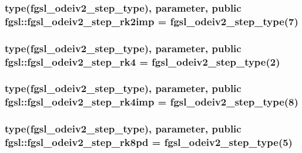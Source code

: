 \hypertarget{classfgsl_a7b4cc51dc91d507009b26f542f372bbd}{
\subsubsection[{fgsl\-\_\-odeiv2\-\_\-step\-\_\-rk2imp}]{\setlength{\rightskip}{0pt plus 5cm}type({\bf fgsl\-\_\-odeiv2\-\_\-step\-\_\-type}), parameter, public fgsl\-::fgsl\-\_\-odeiv2\-\_\-step\-\_\-rk2imp = {\bf fgsl\-\_\-odeiv2\-\_\-step\-\_\-type}(7)}}\label{classfgsl_a7b4cc51dc91d507009b26f542f372bbd}
\hypertarget{classfgsl_a3d8617454e04b4450cc8c8f3101ff504}{
\subsubsection[{fgsl\-\_\-odeiv2\-\_\-step\-\_\-rk4}]{\setlength{\rightskip}{0pt plus 5cm}type({\bf fgsl\-\_\-odeiv2\-\_\-step\-\_\-type}), parameter, public fgsl\-::fgsl\-\_\-odeiv2\-\_\-step\-\_\-rk4 = {\bf fgsl\-\_\-odeiv2\-\_\-step\-\_\-type}(2)}}\label{classfgsl_a3d8617454e04b4450cc8c8f3101ff504}
\hypertarget{classfgsl_ac791c6691e1ebeae5e10c234a26737df}{
\subsubsection[{fgsl\-\_\-odeiv2\-\_\-step\-\_\-rk4imp}]{\setlength{\rightskip}{0pt plus 5cm}type({\bf fgsl\-\_\-odeiv2\-\_\-step\-\_\-type}), parameter, public fgsl\-::fgsl\-\_\-odeiv2\-\_\-step\-\_\-rk4imp = {\bf fgsl\-\_\-odeiv2\-\_\-step\-\_\-type}(8)}}\label{classfgsl_ac791c6691e1ebeae5e10c234a26737df}
\hypertarget{classfgsl_aa7c82f7503be3be3ab81991a3e8eb719}{
\subsubsection[{fgsl\-\_\-odeiv2\-\_\-step\-\_\-rk8pd}]{\setlength{\rightskip}{0pt plus 5cm}type({\bf fgsl\-\_\-odeiv2\-\_\-step\-\_\-type}), parameter, public fgsl\-::fgsl\-\_\-odeiv2\-\_\-step\-\_\-rk8pd = {\bf fgsl\-\_\-odeiv2\-\_\-step\-\_\-type}(5)}}\label{classfgsl_aa7c82f7503be3be3ab81991a3e8eb719}
